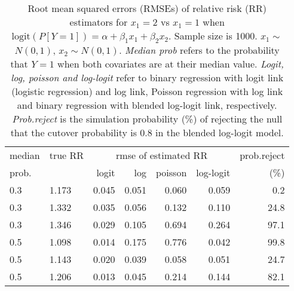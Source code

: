 \documentclass[12pt,a4paper]{article}
\begin{document}
\begin{table}[H] 
\small\sf\centering 
\caption{Root mean squared errors (RMSEs) of relative risk (RR) estimators for $x_1=2$ vs $x_1=1$ when $\mbox{logit}(P[Y=1])=\alpha+\beta_1 x_1 + \beta_2 x_2$. Sample size is 1000. $x_1 \sim $$N(0,1)$, $x_2 \sim N(0,1)$. {\it Median prob} refers to the probability that $Y=1$ when both covariates are at their median value. {\it Logit, log, poisson and log-logit} refer to binary regression with logit link (logistic regression) and log link, Poisson regression with log link and binary regression with blended log-logit link, respectively. {\it Prob.reject} is the simulation probability (\%) of rejecting the null that the cutover probability is $0.8$ in the blended log-logit model.} 
\begin{tabular}{llrrrrr} 
\toprule 
median & true RR & \multicolumn{4}{c}{rmse of estimated RR} & prob.reject \\ 
prob. & & logit & log & poisson & log-logit  & (\%) \\ \midrule 
0.3 & 1.173 & 0.045 & 0.051 & 0.060 & 0.059 &  0.2 \\  
0.3 & 1.332 & 0.035 & 0.056 & 0.132 & 0.110 & 24.8 \\  
0.3 & 1.346 & 0.029 & 0.105 & 0.694 & 0.264 & 97.1 \\  
0.5 & 1.098 & 0.014 & 0.175 & 0.776 & 0.042 & 99.8 \\  
0.5 & 1.143 & 0.020 & 0.039 & 0.058 & 0.051 & 24.7 \\  
0.5 & 1.206 & 0.013 & 0.045 & 0.214 & 0.144 & 82.1 \\  
\bottomrule 
\end{tabular} 
\end{table} 
\end{document}
